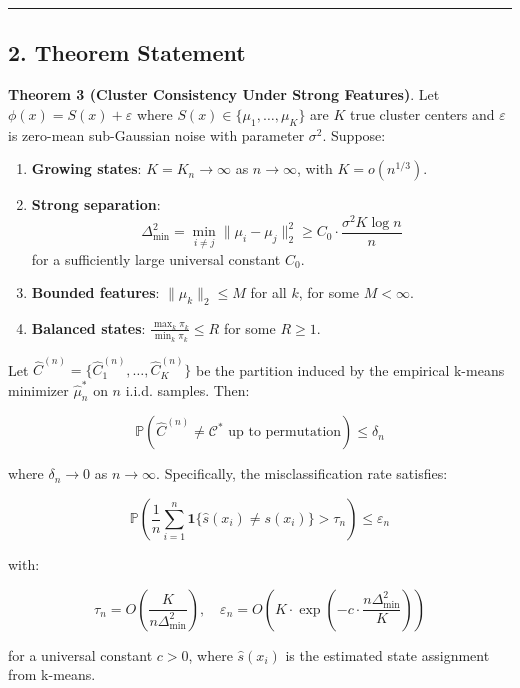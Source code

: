 \documentclass[
  12pt,
]{article}
\providecommand{\tightlist}{%
  \setlength{\itemsep}{0pt}\setlength{\parskip}{0pt}}
\begin{document}
\begin{center}\rule{0.5\linewidth}{0.5pt}\end{center}

\subsection{2. Theorem Statement}\label{theorem-statement}

\textbf{Theorem 3 (Cluster Consistency Under Strong Features)}. Let
\(\phi(x) = S(x) + \varepsilon\) where
\(S(x) \in \{\mu_1, \dots, \mu_K\}\) are \(K\) true cluster centers and
\(\varepsilon\) is zero-mean sub-Gaussian noise with parameter
\(\sigma^2\). Suppose:

\begin{enumerate}
\def\labelenumi{\arabic{enumi}.}
\tightlist
\item
  \textbf{Growing states}: \(K = K_n \to \infty\) as \(n \to \infty\),
  with \(K = o(n^{1/3})\).
\item
  \textbf{Strong separation}:
  \[\Delta_{\min}^2 = \min_{i \neq j} \|\mu_i - \mu_j\|_2^2 \geq C_0 \cdot \frac{\sigma^2 K \log n}{n}\]
  for a sufficiently large universal constant \(C_0\).
\item
  \textbf{Bounded features}: \(\|\mu_k\|_2 \leq M\) for all \(k\), for
  some \(M < \infty\).
\item
  \textbf{Balanced states}: \(\frac{\max_k \pi_k}{\min_k \pi_k} \leq R\)
  for some \(R \geq 1\).
\end{enumerate}

Let \(\hat{C}^{(n)} = \{\hat{C}_1^{(n)}, \dots, \hat{C}_K^{(n)}\}\) be
the partition induced by the empirical k-means minimizer
\(\hat{\mu}_n^*\) on \(n\) i.i.d. samples. Then:

\[\mathbb{P}\left(\hat{C}^{(n)} \neq \mathcal{C}^* \text{ up to permutation}\right) \leq \delta_n\]

where \(\delta_n \to 0\) as \(n \to \infty\). Specifically, the
misclassification rate satisfies:

\[\mathbb{P}\left(\frac{1}{n} \sum_{i=1}^n \mathbf{1}\{\hat{s}(x_i) \neq s(x_i)\} > \tau_n\right) \leq \varepsilon_n\]

with:

\[\tau_n = O\left(\frac{K}{n \Delta_{\min}^2}\right), \quad
\varepsilon_n = O\left(K \cdot \exp\left(-c \cdot \frac{n \Delta_{\min}^2}{K}\right)\right)\]

for a universal constant \(c > 0\), where \(\hat{s}(x_i)\) is the
estimated state assignment from k-means.
\end{document}
